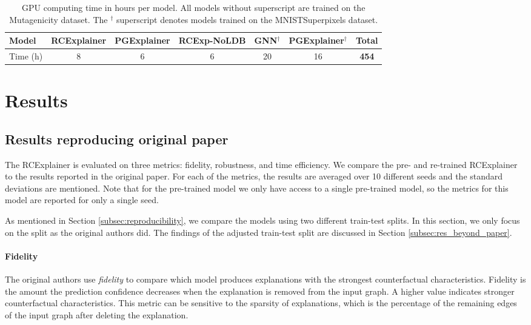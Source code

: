 \begin{table}[h!]
\caption{GPU computing time in hours per model. All models without superscript are trained on the Mutagenicity dataset. The $^\dagger$ superscript denotes models trained on the MNISTSuperpixels dataset.}
\label{tab:computing_time}
\centering
\begin{tabular}{lcccccc}
 \toprule
Model & RCExplainer & PGExplainer & RCExp-NoLDB & GNN$^\dagger$ & PGExplainer$^\dagger$ & \textbf{Total}\\
 \midrule
Time (h) & 8 & 6 & 6 & 20 & 16 & \textbf{454} \\
 \bottomrule
\end{tabular}
\end{table}


\section{Results}
\label{sec:results}

\subsection{Results reproducing original paper} \label{sec:metrics}
The RCExplainer is evaluated on three metrics: fidelity, robustness, and time efficiency. We compare the pre- and re-trained RCExplainer to the results reported in the original paper. For each of the metrics, the results are averaged over 10 different seeds and the standard deviations are mentioned. Note that for the pre-trained model we only have access to a single pre-trained model, so the metrics for this model are reported for only a single seed.

As mentioned in Section \ref{subsec:reproducibility}, we compare the models using two different train-test splits. In this section, we only focus on the split as the original authors did. The findings of the adjusted train-test split are discussed in Section \ref{subsec:res_beyond_paper}.


\paragraph{Fidelity}
The original authors use \textit{fidelity} to compare which model produces explanations with the strongest counterfactual characteristics. Fidelity is the amount the prediction confidence decreases when the explanation is removed from the input graph. A higher value indicates stronger counterfactual characteristics. This metric can be sensitive to the sparsity of explanations, which is the percentage of the remaining edges of the input graph after deleting the explanation.

